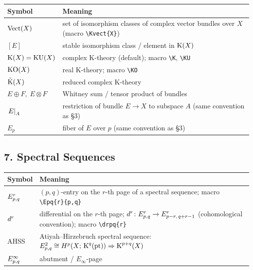 \begin{longtable}{@{} p{4cm} p{10cm} @{}}
	\toprule
	\textbf{Symbol} & \textbf{Meaning} \\
	\midrule
	\endhead
	
	$\mathrm{Vect}(X)$
	& set of isomorphism classes of complex vector bundles over $X$
	(macro \texttt{\textbackslash Kvect\{X\}}) \\[4pt]
	
	$[E]$
	& stable isomorphism class / element in $\operatorname{\mathrm{K}}(X)$ \\[4pt]
	
	$\operatorname{\mathrm{K}}(X) = \mathrm{KU}(X)$
	& complex K-theory (default); macro \texttt{\textbackslash K},
	\texttt{\textbackslash KU} \\[4pt]
	
	$\mathrm{KO}(X)$
	& real K-theory; macro \texttt{\textbackslash KO} \\[4pt]
	
	$\tilde{\operatorname{\mathrm{K}}}(X)$
	& reduced complex K-theory \\[4pt]
	
	$E\oplus F,\; E\otimes F$
	& Whitney sum / tensor product of bundles \\[4pt]
	
	$\left.E\right|_{A}$
	& restriction of bundle $E\to X$ to subspace $A$
	(same convention as §3) \\[4pt]
	
	$E_p$
	& fiber of $E$ over $p$ (same convention as §3) \\[4pt]
	
	\bottomrule
\end{longtable}

\subsection*{7. Spectral Sequences}

\begin{longtable}{@{} p{4cm} p{10cm} @{}}
	\toprule
	\textbf{Symbol} & \textbf{Meaning} \\
	\midrule
	\endhead
	
	$E^{r}_{p,q}$
	& $(p,q)$-entry on the $r$-th page of a spectral sequence;
	macro \texttt{\textbackslash Epq\{r\}\{p,q\}} \\[4pt]
	
	$d^{r}$
	& differential on the $r$-th page;
	$d^{r}\colon E^{r}_{p,q}\to E^{r}_{p-r,\,q+r-1}$
	(cohomological convention);
	macro \texttt{\textbackslash drpq\{r\}} \\[4pt]
	
	AHSS
	& Atiyah--Hirzebruch spectral sequence:
	$E^{2}_{p,q}\cong H^p(X;\,\operatorname{\mathrm{K}}^q(\mathrm{pt}))
	\Rightarrow \operatorname{\mathrm{K}}^{p+q}(X)$ \\[4pt]
	
	$E^{\infty}_{p,q}$
	& abutment / $E_\infty$-page \\[4pt]
	
	\bottomrule
\end{longtable}

